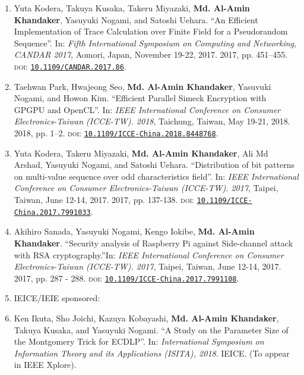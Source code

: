 \begin{enumerate}
   \item	Yuta Kodera, Takuya Kusaka, Takeru Miyazaki, \textbf{Md. Al-Amin Khandaker}, Yasuyuki Nogami, and Satoshi Uehara. ``An Efficient Implementation of Trace Calculation over Finite Field for a Pseudorandom Sequence''. In: \textit{Fifth International Symposium on Computing and Networking, CANDAR 2017}, Aomori, Japan, November 19-22, 2017. 2017, pp. 451–455. \textsc{doi}: \href{https://doi.org/10.1109/CANDAR.2017.86}{\texttt{10.1109/CANDAR.2017.86}}.
   
   	\item Taehwan Park, Hwajeong Seo, \textbf{Md. Al-Amin Khandaker}, Yasuvuki Nogami, and Howon Kim. ``Efficient Parallel Simeck Encryption with GPGPU and OpenCL''. In: \textit{IEEE International Conference on Consumer Electronics-Taiwan (ICCE-TW). 2018}, Taichung, Taiwan, May 19-21, 2018. 2018, pp. 1–2. \textsc{doi}: \href{https://doi.org/10.1109/ICCE-China.2018.8448768}{\texttt{10.1109/ICCE-China.2018.8448768}}.
   	
   	\item Yuta Kodera, Takeru Miyazaki, \textbf{Md. Al-Amin Khandaker}, Ali Md Arshad, Yasuyuki Nogami, and Satoshi Uehara. ``Distribution of bit patterns on multi-value sequence over odd characteristics field''.  In: \textit{IEEE International Conference on Consumer Electronics-Taiwan (ICCE-TW). 2017}, Taipei, Taiwan, June 12-14, 2017. 2017, pp. 137-138. \textsc{doi}: \href{https://doi.org/10.1109/ICCE-China.2017.7991033}{\texttt{10.1109/ICCE-\\China.2017.7991033}}.	
   
	\item Akihiro Sanada, Yasuyuki Nogami, Kengo Iokibe, \textbf{Md. Al-Amin Khandaker}. ``Security analysis of Raspberry Pi against Side-channel attack with RSA cryptography.''In: \textit{IEEE International Conference on Consumer Electronics-Taiwan (ICCE-TW). 2017}, Taipei, Taiwan, June 12-14, 2017. 2017, pp. 287 - 288. \textsc{doi}: \href{https://doi.org/10.1109/ICCE-China.2017.7991108}{\texttt{10.1109/ICCE-China.2017.7991108}}.	
	
		\vspace{5mm}
	\item[ ] \Large IEICE/IEIE sponsored:
	\normalsize
	\item Ken Ikuta, Sho Joichi, Kazuya Kobayashi, \textbf{Md. Al-Amin Khandaker}, Takuya Kusaka, and Yasuyuki Nogami. ``A Study on the Parameter Size of the Montgomery Trick for ECDLP''. In: \textit{International Symposium on Information Theory and its Applications (ISITA), 2018}. IEICE. (To appear in IEEE Xplore).
	

\end{enumerate}
